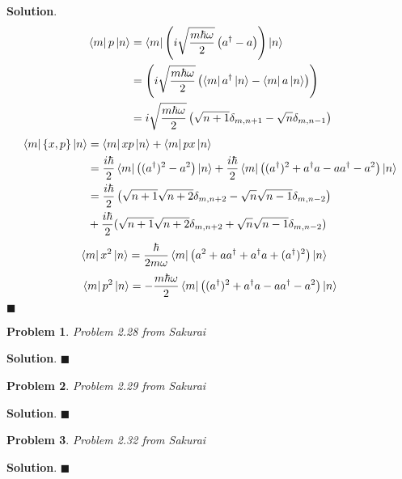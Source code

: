 \documentclass[12pt]{article}
\newtheorem{p}{Problem}
\theoremstyle{definition}
\newenvironment{s}{%
        \begin{trivlist} \item \textbf{Solution}. }{%
            \hspace*{\fill} $\blacksquare$\end{trivlist}}%
\begin{document}
{\begin{s}
\begin{align*}
\bra{m}p\ket{n} &= \bra{m}\left(i\sqrt{\frac{m\hbar \omega}{2}}\left(a^{\dagger}-a\right)\right)\ket{n}\\
&= \left(i\sqrt{\frac{m\hbar \omega}{2}}\left(\bra{m}a^{\dagger}\ket{n}-\bra{m}a\ket{n}\right)\right)\\
&= i\sqrt{\frac{m\hbar \omega}{2}}\left(\sqrt{n+1}\delta_{m,n+1}-\sqrt{n}\delta_{m,n-1}\right)\\
\end{align*}
\begin{align*}
\bra{m}\{x,p\}\ket{n} &= \bra{m}xp\ket{n} + \bra{m}px\ket{n}\\
&= \frac{i\hbar}{2}\bra{m}\left((a^{\dagger})^{2}-a^{2}\right)\ket{n} + \frac{i\hbar}{2}\bra{m}\left((a^{\dagger})^{2} + a^{\dagger}a - aa^{\dagger} - a^{2}\right)\ket{n}\\
&= \frac{i\hbar}{2}\left(\sqrt{n+1}\sqrt{n+2}\delta_{m,n+2} - \sqrt{n}\sqrt{n-1}\delta_{m,n-2}\right)\\
&+ \frac{i\hbar}{2}(\sqrt{n+1}\sqrt{n+2}\delta_{m,n+2} + \sqrt{n}\sqrt{n-1}\delta_{m,n-2})
\end{align*}
\begin{align*}
\bra{m}x^{2}\ket{n} &= \frac{\hbar}{2m\omega}\bra{m}\left(a^{2} + aa^{\dagger} + a^{\dagger} a + (a^{\dagger})^{2}\right)\ket{n}
\end{align*}
\begin{align*}
\bra{m}p^{2}\ket{n} = -\frac{m\hbar \omega}{2}\bra{m}\left((a^{\dagger})^{2} + a^{\dagger}a - aa^{\dagger}-a^{2}\right)\ket{n}
\end{align*}
\end{s}

\begin{p}
Problem 2.28 from Sakurai
\end{p}

\begin{s}
\end{s}

\begin{p}
Problem 2.29 from Sakurai
\end{p}

\begin{s}
\end{s}

\begin{p}
Problem 2.32 from Sakurai
\end{p}

\begin{s}
\end{s}
\end{document}
